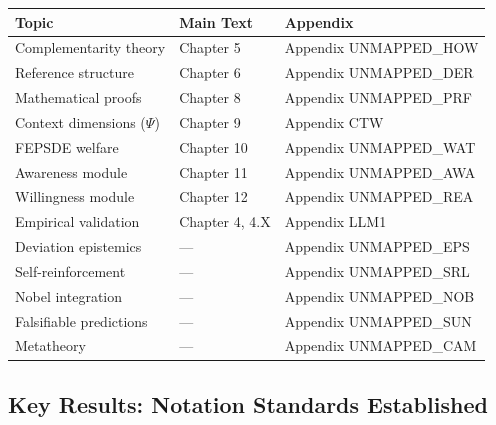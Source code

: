 \begin{center}
\renewcommand{\arraystretch}{1.2}
\begin{tabular}{lll}
\hline
\textbf{Topic} & \textbf{Main Text} & \textbf{Appendix} \\
\hline
Complementarity theory & Chapter 5 & Appendix UNMAPPED_HOW \\
Reference structure & Chapter 6 & Appendix UNMAPPED_DER \\
Mathematical proofs & Chapter 8 & Appendix UNMAPPED_PRF \\
Context dimensions ($\Psi$) & Chapter 9 & Appendix CTW \\
FEPSDE welfare & Chapter 10 & Appendix UNMAPPED_WAT \\
Awareness module & Chapter 11 & Appendix UNMAPPED_AWA \\
Willingness module & Chapter 12 & Appendix UNMAPPED_REA \\
Empirical validation & Chapter 4, 4.X & Appendix LLM1 \\
Deviation epistemics & --- & Appendix UNMAPPED_EPS \\
Self-reinforcement & --- & Appendix UNMAPPED_SRL \\
Nobel integration & --- & Appendix UNMAPPED_NOB \\
Falsifiable predictions & --- & Appendix UNMAPPED_SUN \\
Metatheory & --- & Appendix UNMAPPED_CAM \\
\hline
\end{tabular}
\end{center}


\subsection{Key Results: Notation Standards Established}
\label{sec:glossary-results}

